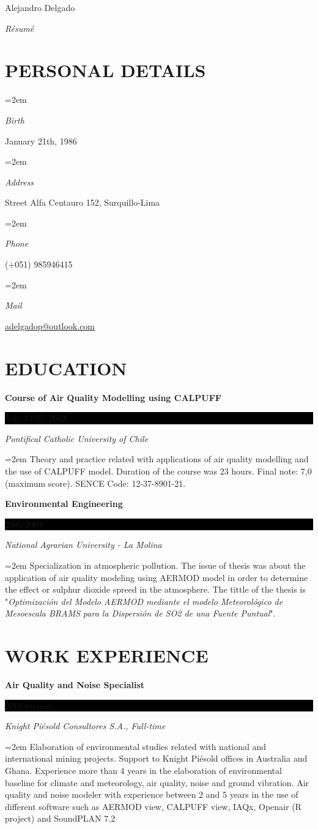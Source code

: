 \documentclass[paper=a4,fontsize=11pt]{scrartcl} %
\newlength{\spacebox}
\newcommand{\sepspace}{\vspace*{1em}}		%
\newcommand{\MyName}[1]{ %
		\Huge \usefont{OT1}{phv}{b}{n} \hfill #1
		\par \normalsize \normalfont}
\newcommand{\MySlogan}[1]{ %
		\large \usefont{OT1}{phv}{m}{n}\hfill \textit{#1}
		\par \normalsize \normalfont}
\newcommand{\NewPart}[1]{\section*{\uppercase{#1}}}
\newcommand{\PersonalEntry}[2]{
		\noindent\hangindent=2em\hangafter=0 %
		\parbox{\spacebox}{        %
		\textit{#1}}		       %
		\hspace{1.5em} #2 \par}    %
\newcommand{\EducationEntry}[4]{
		\noindent \textbf{#1} \hfill      %
		\colorbox{Black}{%
			\parbox{6em}{%
			\hfill\color{White}#2}} \par  %
		\noindent \textit{#3} \par        %
		\noindent\hangindent=2em\hangafter=0 \small #4 %
		\normalsize \par}
\begin{document}

\MyName{Alejandro Delgado}
\MySlogan{Résumé}

\sepspace

\NewPart{Personal details}{}

\PersonalEntry{Birth}{January 21th, 1986}
\PersonalEntry{Address}{Street Alfa Centauro 152, Surquillo-Lima}
\PersonalEntry{Phone}{(+051) 985946415}
\PersonalEntry{Mail}{\url{adelgadop@outlook.com}}

\NewPart{Education}{}

\EducationEntry{Course of Air Quality Modelling using CALPUFF}{July 23-27, 2012}{Pontifical Catholic University of Chile}{Theory and practice related with applications of air quality modelling and the use of CALPUFF model. Duration of the course was 23 hours. Final note: 7,0 (maximum score). SENCE Code: 12-37-8901-21.}
\sepspace

\EducationEntry{Environmental Engineering}{2005-2009}{National Agrarian University - La Molina}{Specialization in atmospheric pollution. The issue of thesis was about the application of air quality modeling using AERMOD model in order to determine the effect or sulphur dioxide spreed in the atmosphere. The tittle of the thesis is "\textit{Optimización del Modelo AERMOD mediante el modelo Meteorológico de Mesoescala BRAMS para la Dispersión de SO2
 de una Fuente Puntual}".}

\NewPart{Work experience}{}

\EducationEntry{Air Quality and Noise Specialist}{2011-present}{Knight Piésold Consultores S.A., Full-time}{Elaboration of environmental studies related with national and international mining projects. Support to Knight Piésold offices in Australia and Ghana. Experience more than 4 years in the elaboration of environmental baseline for climate and meteorology, air quality, noise and ground vibration. Air quality and noise modeler with experience between 2 and 5 years in the use of different software such as AERMOD view, CALPUFF view, IAQx, Openair (R project) and SoundPLAN 7.2}
\sepspace
\end{document}
